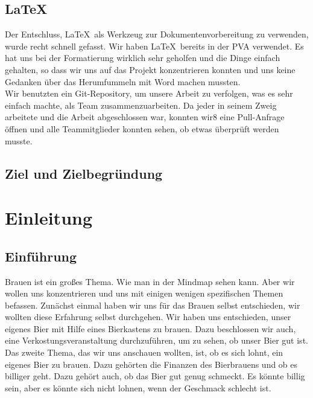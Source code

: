 \subsection{\LaTeX\ }
Der Entschluss, \LaTeX\  als Werkzeug zur Dokumentenvorbereitung zu verwenden, wurde recht schnell gefasst. Wir haben \LaTeX\  bereits in
 der PVA verwendet. Es hat uns bei der Formatierung wirklich sehr geholfen und die Dinge einfach gehalten,
 so dass wir uns auf das Projekt konzentrieren konnten und uns keine Gedanken über das Herumfummeln mit Word machen mussten.
\\
Wir benutzten ein Git-Repository, um unsere Arbeit zu verfolgen, was es sehr einfach machte, als Team zusammenzuarbeiten. Da jeder in seinem Zweig arbeitete und die Arbeit abgeschlossen war,
 konnten wir8 eine Pull-Anfrage öffnen und alle Teammitglieder konnten sehen, ob etwas überprüft werden musste.
\subsection{Ziel und Zielbegründung}
\newpage
\section{Einleitung}
\subsection{Einführung}
Brauen ist ein großes Thema. Wie man in der Mindmap sehen kann. Aber wir wollen uns konzentrieren und uns mit einigen wenigen spezifischen Themen befassen.
Zunächst einmal haben wir uns für das Brauen selbst entschieden, wir wollten diese Erfahrung selbst durchgehen. Wir haben uns entschieden, unser eigenes Bier mit Hilfe eines Bierkastens zu brauen. Dazu beschlossen wir auch, eine Verkostungsveranstaltung durchzuführen, um zu sehen, ob unser Bier gut ist. 
Das zweite Thema, das wir uns anschauen wollten, ist, ob es sich lohnt, ein eigenes Bier zu brauen. Dazu gehörten die Finanzen des Bierbrauens und ob es billiger geht. Dazu gehört auch, ob das Bier gut genug schmeckt. Es könnte billig sein, aber es könnte sich nicht lohnen, wenn der Geschmack schlecht ist.

